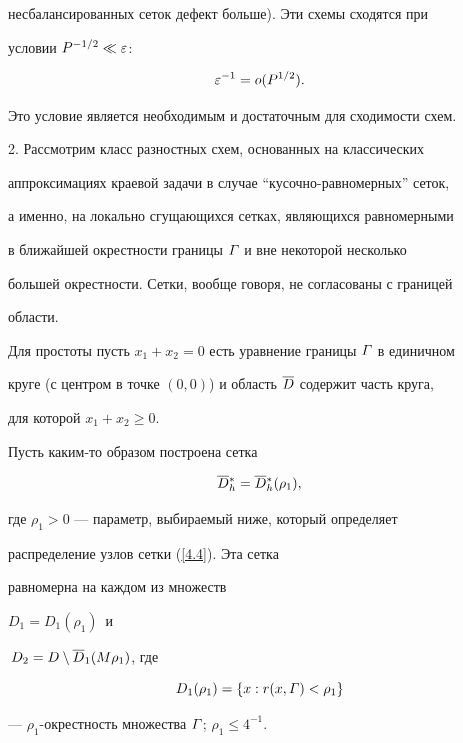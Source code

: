 несбалансированных сеток дефект больше). Эти схемы сходятся при


условии  $P^{-1/2} \ll \varepsilon$:


\begin{equation} \label{4.3}


\eps^{-1}=o(P^{1/2}).


\end{equation}


Это условие является необходимым и достаточным для сходимости схем.





2. Рассмотрим класс разностных схем, основанных на классических


аппроксимациях краевой задачи в случае ``кусочно-равномерных'' сеток,


а именно, на локально сгущающихся сетках, являющихся равномерными


в ближайшей окрестности границы $\varGamma$ и вне некоторой несколько


большей окрестности. Сетки, вообще говоря, не согласованы с границей


области.





Для простоты пусть $x_1+x_2=0$ есть уравнение границы $\varGamma$ в единичном


круге (с центром в точке $(0,0)$) и область $\overline{D}$ содержит часть круга,


для которой $x_1+x_2 \ge 0$.


Пусть каким-то образом построена сетка


\begin{equation} \label{4.4}


\Db{}_h^{*}=\Db{}_h^{*}(\rho_1),


\end{equation}


где $\rho_1>0$ --- параметр, выбираемый ниже, который определяет


распределение узлов сетки (\ref{4.4}). Эта сетка


равномерна на каждом из множеств


$D_1=D_1(\rho_1)\,$ и


$\,D_2=D\setminus \overline{D}_1(M\rho_1)$, где 


$$


D_1(\rho_1)=\{x: r(x,\G)<\rho_1\}


$$


--- $\rho_1$-окрестность множества $\varGamma$; $\rho_1\le 4^{-1}$.


